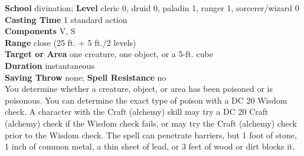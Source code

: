 \textbf{School} divination; \textbf{Level} cleric 0, druid 0, paladin 1, ranger 1, sorcerer/wizard 0\\
\textbf{Casting Time} 1 standard action\\
\textbf{Components} V, S\\
\textbf{Range} close (25 ft. + 5 ft./2 levels)\\
\textbf{Target or Area} one creature, one object, or a 5-ft. cube\\
\textbf{Duration} instantaneous\\
\textbf{Saving Throw} none; \textbf{Spell Resistance} no\\
You determine whether a creature, object, or area has been poisoned or is poisonous. You can determine the exact type of poison with a DC 20 Wisdom check. A character with the Craft (alchemy) skill may try a DC 20 Craft (alchemy) check if the Wisdom check fails, or may try the Craft (alchemy) check prior to the Wisdom check. The spell can penetrate barriers, but 1 foot of stone, 1 inch of common metal, a thin sheet of lead, or 3 feet of wood or dirt blocks it.\\
